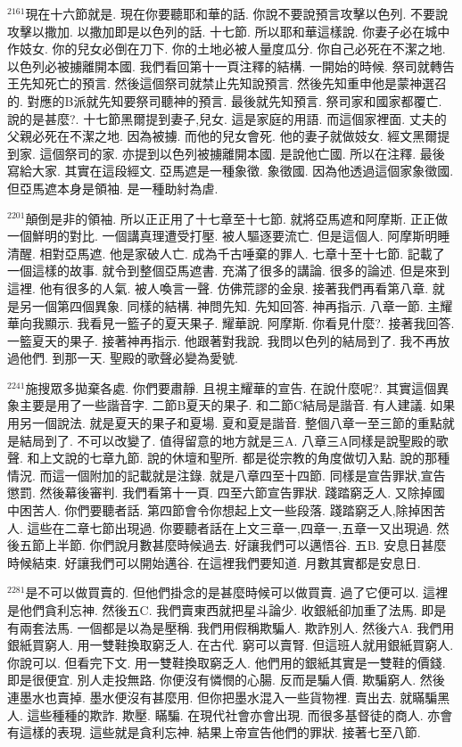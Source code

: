\documentclass{book}
\begin{document}
$^{2161}$現在十六節就是.
現在你要聽耶和華的話.
你說不要說預言攻擊以色列.
不要說攻擊以撒加.
以撒加即是以色列的話.
十七節.
所以耶和華這樣說.
你妻子必在城中作妓女.
你的兒女必倒在刀下.
你的土地必被人量度瓜分.
你自己必死在不潔之地.
以色列必被擄離開本國.
我們看回第十一頁注釋的結構.
一開始的時候.
祭司就轉告王先知死亡的預言.
然後這個祭司就禁止先知說預言.
然後先知重申他是蒙神選召的.
對應的B派就先知要祭司聽神的預言.
最後就先知預言.
祭司家和國家都覆亡.
說的是甚麼?.
十七節黑爾提到妻子,兒女.
這是家庭的用語.
而這個家裡面.
丈夫的父親必死在不潔之地.
因為被擄.
而他的兒女會死.
他的妻子就做妓女.
經文黑爾提到家.
這個祭司的家.
亦提到以色列被擄離開本國.
是說他亡國.
所以在注釋.
最後寫給大家.
其實在這段經文.
亞馬遮是一種象徵.
象徵國.
因為他透過這個家象徵國.
但亞馬遮本身是領袖.
是一種助紂為虐.

$^{2201}$顛倒是非的領袖.
所以正正用了十七章至十七節.
就將亞馬遮和阿摩斯.
正正做一個鮮明的對比.
一個講真理遭受打壓.
被人驅逐要流亡.
但是這個人.
阿摩斯明睡清醒.
相對亞馬遮.
他是家破人亡.
成為千古唾棄的罪人.
七章十至十七節.
記載了一個這樣的故事.
就令到整個亞馬遮書.
充滿了很多的講論.
很多的論述.
但是來到這裡.
他有很多的人氣.
被人喚言一聲.
仿佛荒謬的金泉.
接著我們再看第八章.
就是另一個第四個異象.
同樣的結構.
神問先知.
先知回答.
神再指示.
八章一節.
主耀華向我顯示.
我看見一籃子的夏天果子.
耀華說.
阿摩斯.
你看見什麼?.
接著我回答.
一籃夏天的果子.
接著神再指示.
他跟著對我說.
我問以色列的結局到了.
我不再放過他們.
到那一天.
聖殿的歌聲必變為愛號.

$^{2241}$施搜眾多拋棄各處.
你們要肅靜.
且視主耀華的宣告.
在說什麼呢?.
其實這個異象主要是用了一些諧音字.
二節B夏天的果子.
和二節C結局是諧音.
有人建議.
如果用另一個說法.
就是夏天的果子和夏場.
夏和夏是諧音.
整個八章一至三節的重點就是結局到了.
不可以改變了.
值得留意的地方就是三A.
八章三A同樣是說聖殿的歌聲.
和上文說的七章九節.
說的休壇和聖所.
都是從宗教的角度做切入點.
說的那種情況.
而這一個附加的記載就是注錄.
就是八章四至十四節.
同樣是宣告罪狀,宣告懲罰.
然後幕後審判.
我們看第十一頁.
四至六節宣告罪狀.
踐踏窮乏人.
又除掉國中困苦人.
你們要聽者話.
第四節會令你想起上文一些段落.
踐踏窮乏人,除掉困苦人.
這些在二章七節出現過.
你要聽者話在上文三章一,四章一,五章一又出現過.
然後五節上半節.
你們說月數甚麼時候過去.
好讓我們可以邁悟谷.
五B.
安息日甚麼時候結束.
好讓我們可以開始邁谷.
在這裡我們要知道.
月數其實都是安息日.

$^{2281}$是不可以做買賣的.
但他們掛念的是甚麼時候可以做買賣.
過了它便可以.
這裡是他們貪利忘神.
然後五C.
我們賣東西就把星斗論少.
收銀紙卻加重了法馬.
即是有兩套法馬.
一個都是以為是壓稱.
我們用假稱欺騙人.
欺詐別人.
然後六A.
我們用銀紙買窮人.
用一雙鞋換取窮乏人.
在古代.
窮可以賣腎.
但這班人就用銀紙買窮人.
你說可以.
但看完下文.
用一雙鞋換取窮乏人.
他們用的銀紙其實是一雙鞋的價錢.
即是很便宜.
別人走投無路.
你便沒有憐憫的心腸.
反而是騙人價.
欺騙窮人.
然後連墨水也賣掉.
墨水便沒有甚麼用.
但你把墨水混入一些貨物裡.
賣出去.
就瞞騙黑人.
這些種種的欺詐.
欺壓.
瞞騙.
在現代社會亦會出現.
而很多基督徒的商人.
亦會有這樣的表現.
這些就是貪利忘神.
結果上帝宣告他們的罪狀.
接著七至八節.
\end{document}

